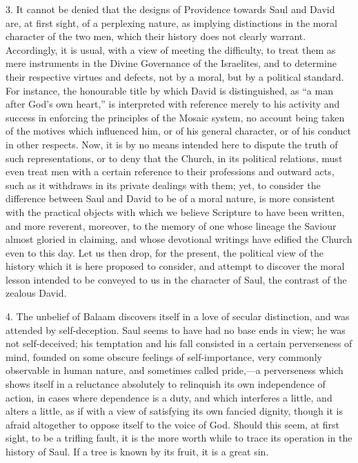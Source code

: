 3. It cannot be denied that the designs of Providence towards Saul
and David are, at first sight, of a perplexing nature, as implying
distinctions in the moral character of the two men, which their
history does not clearly warrant. Accordingly, it is usual, with a
view of meeting the difficulty, to treat them as mere instruments in
the Divine Governance of the Israelites, and to determine their
respective virtues and defects, not by a moral, but by a political
standard. For instance, the honourable title by which David is
distinguished, as ``a man after God's own heart,'' is
interpreted with reference merely to his activity and success in
enforcing the principles of the Mosaic system, no account being taken
of the motives which influenced him, or of his general character, or
of his conduct in other respects. Now, it is by no means intended here
to dispute the truth of such representations, or to deny that the
Church, in its political relations, must even treat men with a certain
reference to their professions and outward acts, such as it withdraws
in its private dealings with them; yet, to consider the difference
between Saul and David to be of a moral nature, is more consistent
with the practical objects with which we believe Scripture to have
been written, and more reverent, moreover, to the memory of one whose
lineage the Saviour almost gloried in claiming, and whose devotional
writings have edified the Church even to this day. Let us then drop,
for the present, the political view of the history which it is here
proposed to consider, and attempt to discover the moral lesson
intended to be conveyed to us in the character of Saul, the contrast
of the zealous David.

4. The unbelief of Balaam discovers itself in a love of secular
distinction, and was attended by self-deception. Saul seems to have
had no base ends in view; he was not self-deceived; his temptation and
his fall consisted in a certain perverseness of mind, founded on some
obscure feelings of self-importance, very commonly observable in human
nature, and sometimes called pride,—a perverseness which shows
itself in a reluctance absolutely to relinquish its own independence
of action, in cases where dependence is a duty, and which interferes a
little, and alters a little, as if with a view of satisfying its own
fancied dignity, though it is afraid altogether to oppose itself to
the voice of God. Should this seem, at first sight, to be a trifling
fault, it is the more worth while to trace its operation in the
history of Saul. If a tree is known by its fruit, it is a great sin.

